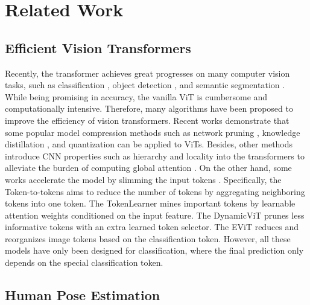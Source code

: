 \documentclass[runningheads]{llncs}
\begin{document}
\vspace{-0.5em}
\section{Related Work}
\vspace{-0.5em}
\subsection{Efficient Vision Transformers}

Recently, the transformer \cite{vaswani2017attention} achieves great progresses on many computer vision tasks, such as classification \cite{dosovitskiy2020image,touvron2020training}, object detection \cite{carion2020end,zhu2020deformable,fang2021you}, and semantic segmentation \cite{zheng2020rethinking,wang2020end,yan2022after,you2022class}. 
While being promising in accuracy, the vanilla ViT \cite{dosovitskiy2020image} is cumbersome and computationally intensive. Therefore, many algorithms have been proposed to improve the efficiency of vision transformers. 
Recent works demonstrate that some popular model compression methods such as network pruning \cite{han2015deep,chen2021chasing,chen2022principle,yu2022unified}, knowledge distillation \cite{hinton2015distilling,touvron2020training,chen2022dearkd}, and quantization \cite{shen2020q,sun2022vaqf} can be applied to ViTs. 
Besides, other methods introduce CNN properties such as hierarchy and locality into the transformers to alleviate the burden of computing global attention \cite{liu2021swin,chen2021crossvit}. 
On the other hand, some works accelerate the model by slimming the input tokens \cite{yuan2021tokens,caron2021emerging,ryoo2021tokenlearner,rao2021dynamicvit,kong2021spvit,liang2022evit,meng2022adavit}. 
Specifically, the Token-to-tokens \cite{yuan2021tokens} aims to reduce the number of tokens by aggregating neighboring tokens into one token. 
The TokenLearner \cite{ryoo2021tokenlearner} mines important tokens by learnable attention weights conditioned on the input feature. 
The DynamicViT \cite{rao2021dynamicvit} prunes less informative tokens with an extra learned token selector.
The EViT \cite{liang2022evit} reduces and reorganizes image tokens based on the classification token. 
However, all these models have only been designed for classification, where the final prediction only depends on the special classification token. 




\vspace{-0.5em}
\subsection{Human Pose Estimation}
\end{document}
